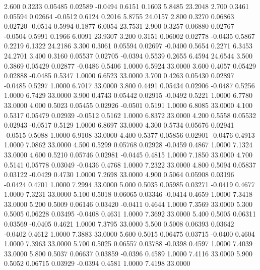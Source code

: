    2.600   0.3233   0.05485   0.02589  -0.0494   0.6151   0.1603   5.8485  23.2048
   2.700   0.3461   0.05594   0.02664  -0.0512   0.6124   0.2016   5.8755  24.0157
   2.800   0.3270   0.06863   0.02720  -0.0514   0.5994   0.1877   6.0054  23.7531
   2.900   0.3257   0.06880   0.02767  -0.0504   0.5991   0.1966   6.0091  23.9307
   3.200   0.3151   0.06002   0.02778  -0.0435   0.5867   0.2219   6.1322  24.2186
   3.300   0.3061   0.05594   0.02697  -0.0400   0.5654   0.2271   6.3453  24.2701
   3.400   0.3160   0.05537   0.02705  -0.0394   0.5539   0.2655   6.4594  24.6544
   3.500   0.3869   0.05429   0.02877  -0.0486   0.5406   1.0000   6.5924  33.0000
   3.600   0.4057   0.05429   0.02888  -0.0485   0.5347   1.0000   6.6523  33.0000
   3.700   0.4263   0.05430   0.02897  -0.0485   0.5297   1.0000   6.7017  33.0000
   3.800   0.4491   0.05434   0.02906  -0.0487   0.5256   1.0000   6.7429  33.0000
   3.900   0.4743   0.05442   0.02915  -0.0492   0.5221   1.0000   6.7780  33.0000
   4.000   0.5023   0.05455   0.02926  -0.0501   0.5191   1.0000   6.8085  33.0000
   4.100   0.5317   0.05479   0.02939  -0.0512   0.5162   1.0000   6.8372  33.0000
   4.200   0.5558   0.05532   0.02943  -0.0517   0.5129   1.0000   6.8697  33.0000
   4.300   0.5734   0.05676   0.02941  -0.0515   0.5088   1.0000   6.9108  33.0000
   4.400   0.5377   0.05856   0.02901  -0.0476   0.4913   1.0000   7.0862  33.0000
   4.500   0.5299   0.05768   0.02928  -0.0459   0.4867   1.0000   7.1324  33.0000
   4.600   0.5210   0.05746   0.02981  -0.0445   0.4815   1.0000   7.1850  33.0000
   4.700   0.5141   0.05778   0.03049  -0.0436   0.4768   1.0000   7.2322  33.0000
   4.800   0.5094   0.05837   0.03122  -0.0429   0.4730   1.0000   7.2698  33.0000
   4.900   0.5064   0.05908   0.03196  -0.0424   0.4701   1.0000   7.2994  33.0000
   5.000   0.5035   0.05985   0.03271  -0.0419   0.4677   1.0000   7.3231  33.0000
   5.100   0.5018   0.06065   0.03346  -0.0414   0.4659   1.0000   7.3418  33.0000
   5.200   0.5009   0.06146   0.03420  -0.0411   0.4644   1.0000   7.3569  33.0000
   5.300   0.5005   0.06228   0.03495  -0.0408   0.4631   1.0000   7.3692  33.0000
   5.400   0.5005   0.06311   0.03569  -0.0405   0.4621   1.0000   7.3795  33.0000
   5.500   0.5008   0.06393   0.03642  -0.0402   0.4612   1.0000   7.3883  33.0000
   5.600   0.5015   0.06475   0.03715  -0.0400   0.4604   1.0000   7.3963  33.0000
   5.700   0.5025   0.06557   0.03788  -0.0398   0.4597   1.0000   7.4039  33.0000
   5.800   0.5037   0.06637   0.03859  -0.0396   0.4589   1.0000   7.4116  33.0000
   5.900   0.5052   0.06715   0.03929  -0.0394   0.4581   1.0000   7.4198  33.0000

